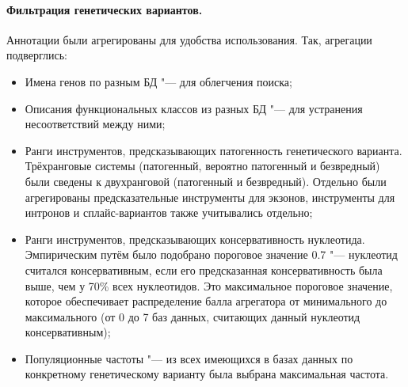 \documentclass[a4paper,14pt]{extarticle}
\begin{document}
\paragraph{Фильтрация генетических вариантов.}
Аннотации были агрегированы для удобства использования.
Так, агрегации подверглись:

\begin{itemize}
\item Имена генов по разным БД "--- для облегчения поиска;
\item Описания функциональных классов из разных БД "--- для устранения несоответствий между ними;
\item Ранги инструментов, предсказывающих патогенность генетического варианта.
Трёхранговые системы (патогенный, вероятно патогенный и безвредный) были сведены к двухранговой (патогенный и безвредный).
Отдельно были агрегированы предсказательные инструменты для экзонов, инструменты для интронов и сплайс-вариантов также учитывались отдельно;
\item Ранги инструментов, предсказывающих консервативность нуклеотида.
Эмпирическим путём было подобрано пороговое значение 0.7 "--- нуклеотид считался консервативным, если его предсказанная консервативность была выше, чем у 70\% всех нуклеотидов.
Это максимальное пороговое значение, которое обеспечивает распределение балла агрегатора от минимального до максимального (от 0 до 7 баз данных, считающих данный нуклеотид консервативным);
\item Популяционные частоты "--- из всех имеющихся в базах данных по конкретному генетическому варианту была выбрана максимальная частота.
\end{itemize}
\end{document}
